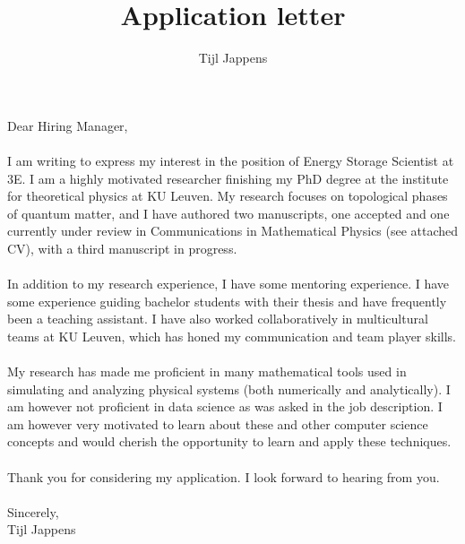 \documentclass[11pt]{article}
\title{Application letter}
\author{Tijl Jappens}
\begin{document}
\maketitle
Dear Hiring Manager,\\\\
I am writing to express my interest in the position of Energy Storage Scientist at 3E. I am a highly motivated researcher finishing my PhD degree at the institute for theoretical physics at KU Leuven. My research focuses on topological phases of quantum matter, and I have authored two manuscripts, one accepted and one currently under review in Communications in Mathematical Physics (see attached CV), with a third manuscript in progress.\\\\
In addition to my research experience, I have some mentoring experience. I have some experience guiding bachelor students with their thesis and have frequently been a teaching assistant. I have also worked collaboratively in multicultural teams at KU Leuven, which has honed my communication and team player skills.\\\\
My research has made me proficient in many mathematical tools used in simulating and analyzing physical systems (both numerically and analytically). I am however not proficient in data science as was asked in the job description. I am however very motivated to learn about these and other computer science concepts and would cherish the opportunity to learn and apply these techniques.
\\\\
Thank you for considering my application. I look forward to hearing from you.\\\\
Sincerely,\\
Tijl Jappens
\end{document}
